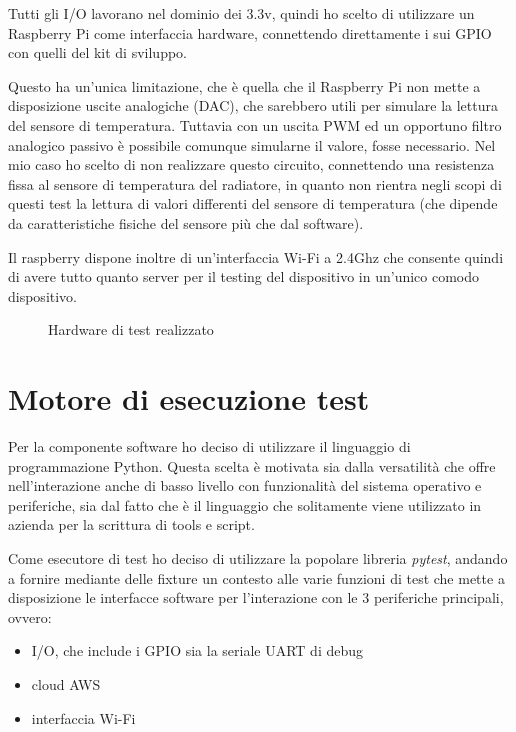 \documentclass[12pt,a4paper,twoside,titlepage]{book}
\begin{document}
Tutti gli I/O lavorano nel dominio dei 3.3v, quindi ho scelto di utilizzare un
Raspberry Pi come interfaccia hardware, connettendo direttamente i sui GPIO con
quelli del kit di sviluppo.

Questo ha un'unica limitazione, che è quella che il Raspberry Pi non mette a disposizione
uscite analogiche (DAC), che sarebbero utili per simulare la lettura del sensore di
temperatura. Tuttavia con un uscita PWM ed un opportuno filtro analogico passivo è
possibile comunque simularne il valore, fosse necessario. Nel mio caso ho scelto di
non realizzare questo circuito, connettendo una resistenza fissa al sensore di
temperatura del radiatore, in quanto non rientra negli scopi di questi test la lettura
di valori differenti del sensore di temperatura (che dipende da caratteristiche fisiche
del sensore più che dal software).

Il raspberry dispone inoltre di un'interfaccia Wi-Fi a 2.4Ghz che consente quindi di
avere tutto quanto server per il testing del dispositivo in un'unico comodo dispositivo.

\begin{figure}
    \caption{Hardware di test realizzato}
    \label{fig:quadretto}
\end{figure}

\section{Motore di esecuzione test}

Per la componente software ho deciso di utilizzare il linguaggio di programmazione
Python. Questa scelta è motivata sia dalla versatilità che offre nell'interazione anche
di basso livello con funzionalità del sistema operativo e periferiche, sia dal fatto
che è il linguaggio che solitamente viene utilizzato in azienda per la scrittura di
tools e script.

Come esecutore di test ho deciso di utilizzare la popolare libreria \textit{pytest},
andando a fornire mediante delle fixture un contesto alle varie funzioni di test che
mette a disposizione le interfacce software per l'interazione con le 3 periferiche
principali, ovvero:

\begin{itemize}
    \item I/O, che include i GPIO sia la seriale UART di debug
    \item cloud AWS
    \item interfaccia Wi-Fi
\end{itemize}
\end{document}
